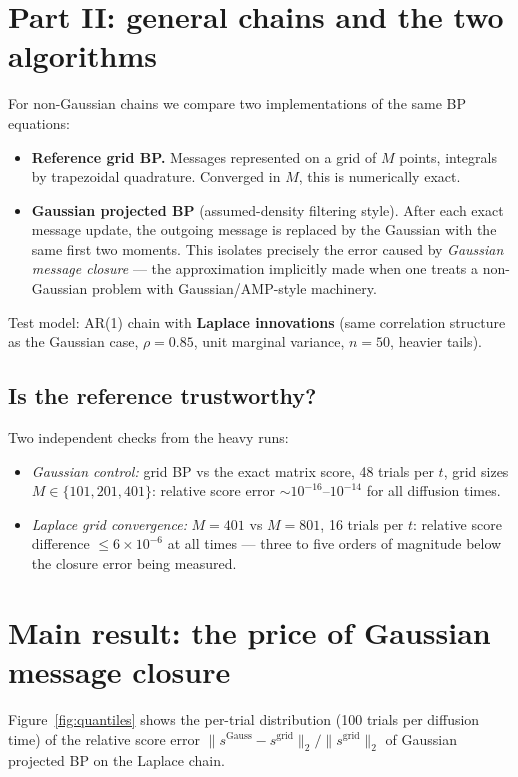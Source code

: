 \documentclass[11pt]{article}
\begin{document}
\section{Part II: general chains and the two algorithms}

For non-Gaussian chains we compare two implementations of the same BP equations:
\begin{itemize}
  \item \textbf{Reference grid BP.} Messages represented on a grid of $M$ points,
  integrals by trapezoidal quadrature. Converged in $M$, this is numerically exact.
  \item \textbf{Gaussian projected BP} (assumed-density filtering style). After each exact
  message update, the outgoing message is replaced by the Gaussian with the same first two
  moments. This isolates precisely the error caused by \emph{Gaussian message closure} ---
  the approximation implicitly made when one treats a non-Gaussian problem with
  Gaussian/AMP-style machinery.
\end{itemize}
Test model: AR(1) chain with \textbf{Laplace innovations} (same correlation structure as
the Gaussian case, $\rho=0.85$, unit marginal variance, $n=50$, heavier tails).

\subsection*{Is the reference trustworthy?}

Two independent checks from the heavy runs:
\begin{itemize}
  \item \emph{Gaussian control:} grid BP vs the exact matrix score, 48 trials per $t$,
  grid sizes $M \in \{101,201,401\}$: relative score error
  $\sim 10^{-16}$--$10^{-14}$ for all diffusion times.
  \item \emph{Laplace grid convergence:} $M=401$ vs $M=801$, 16 trials per $t$: relative
  score difference $\le 6\times 10^{-6}$ at all times --- three to five orders of
  magnitude below the closure error being measured.
\end{itemize}

\section{Main result: the price of Gaussian message closure}

Figure~\ref{fig:quantiles} shows the per-trial distribution (100 trials per diffusion
time) of the relative score error
$\|s^{\mathrm{Gauss}} - s^{\mathrm{grid}}\|_2 / \|s^{\mathrm{grid}}\|_2$
of Gaussian projected BP on the Laplace chain.
\end{document}
